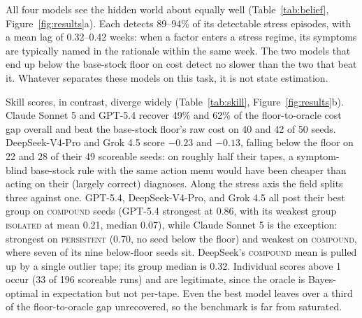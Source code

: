 \documentclass{article}
\begin{document}
All four models see the hidden world about equally well
(Table~\ref{tab:belief}, Figure~\ref{fig:results}a). Each detects 89--94\% of
its detectable stress episodes, with a mean lag of 0.32--0.42 weeks: when a factor
enters a stress regime, its symptoms are typically named in the rationale
within the same week. The two models that end up below the base-stock
floor on cost detect no slower than the two that beat it. Whatever separates
these models on this task, it is not state estimation.

Skill scores, in contrast, diverge widely (Table~\ref{tab:skill},
Figure~\ref{fig:results}b). Claude Sonnet 5 and GPT-5.4 recover 49\% and
62\% of the floor-to-oracle cost gap overall and beat the base-stock
floor's raw cost on 40 and 42 of 50 seeds. DeepSeek-V4-Pro and Grok 4.5
score $-0.23$ and $-0.13$, falling below the floor on 22 and 28 of their
49 scoreable seeds: on roughly half their tapes, a symptom-blind
base-stock rule with the same action menu would have been cheaper than
acting on their (largely correct) diagnoses. Along the stress axis the
field splits three against one. GPT-5.4, DeepSeek-V4-Pro, and Grok 4.5
all post their best group on \textsc{compound} seeds (GPT-5.4 strongest
at 0.86, with its weakest group \textsc{isolated} at mean 0.21, median
0.07), while Claude Sonnet 5 is the exception: strongest on
\textsc{persistent} (0.70, no seed below the floor) and weakest on
\textsc{compound}, where seven of its nine below-floor seeds sit.
DeepSeek's \textsc{compound} mean is pulled up by a single outlier tape;
its group median is 0.32. Individual scores above 1 occur (33 of 196
scoreable runs) and are legitimate, since the oracle is Bayes-optimal in
expectation but not per-tape. Even the best model leaves over a third of
the floor-to-oracle gap unrecovered, so the benchmark is far from
saturated.
\end{document}
